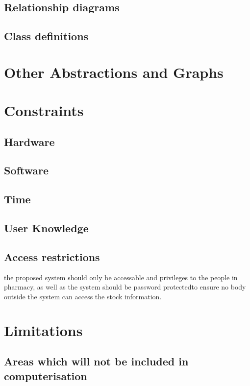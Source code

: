 \subsection{Relationship diagrams}

\subsection{Class definitions}

\section{Other Abstractions and Graphs}

\section{Constraints}

\subsection{Hardware}

\subsection{Software}

\subsection{Time}

\subsection{User Knowledge}

\subsection{Access restrictions}
the proposed system should only be accessable and privileges to the people in pharmacy, as well as the system should be password protectedto ensure no body outside the system can access the stock information.
\space

\section{Limitations}

\subsection{Areas which will not be included in computerisation}

